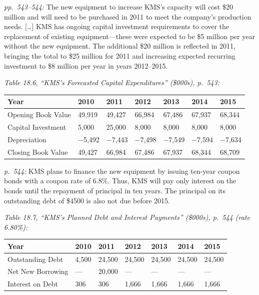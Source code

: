 \documentclass[11pt,a4paper]{article}
\begin{document}
\emph{pp.~543--544:} The new equipment to increase KMS's capacity will cost \$20 million and will
need to be purchased in 2011 to meet the company's production needs. {[}\ldots{]} KMS has ongoing
capital investment requirements to cover the replacement of existing equipment---these were expected
to be \$5 million per year without the new equipment. The additional \$20 million is reflected in
2011, bringing the total to \$25 million for 2011 and increasing expected recurring investment to
\$8 million per year in years 2012--2015.

\emph{Table 18.6, ``KMS's Forecasted Capital Expenditures'' (\$000s), p.~543:}

{\def\LTcaptype{none} %
\begin{longtable}[]{@{}lllllll@{}}
\toprule\noalign{}
Year & 2010 & 2011 & 2012 & 2013 & 2014 & 2015 \\
\midrule\noalign{}
\endhead
\bottomrule\noalign{}
\endlastfoot
Opening Book Value & 49,919 & 49,427 & 66,984 & 67,486 & 67,937 & 68,344 \\
Capital Investment & 5,000 & 25,000 & 8,000 & 8,000 & 8,000 & 8,000 \\
Depreciation & −5,492 & −7,443 & −7,498 & −7,549 & −7,594 & −7,634 \\
Closing Book Value & 49,427 & 66,984 & 67,486 & 67,937 & 68,344 & 68,709 \\
\end{longtable}
}

\emph{p.~544:} KMS plans to finance the new equipment by issuing ten-year coupon bonds with a coupon
rate of 6.8\%. Thus, KMS will pay only interest on the bonds until the repayment of principal in ten
years. The principal on its outstanding debt of \$4500 is also not due before 2015.

\emph{Table 18.7, ``KMS's Planned Debt and Interest Payments'' (\$000s), p.~544 (rate 6.80\%):}

{\def\LTcaptype{none} %
\begin{longtable}[]{@{}lllllll@{}}
\toprule\noalign{}
Year & 2010 & 2011 & 2012 & 2013 & 2014 & 2015 \\
\midrule\noalign{}
\endhead
\bottomrule\noalign{}
\endlastfoot
Outstanding Debt & 4,500 & 24,500 & 24,500 & 24,500 & 24,500 & 24,500 \\
Net New Borrowing & --- & 20,000 & --- & --- & --- & --- \\
Interest on Debt & 306 & 306 & 1,666 & 1,666 & 1,666 & 1,666 \\
\end{longtable}
}
\end{document}

